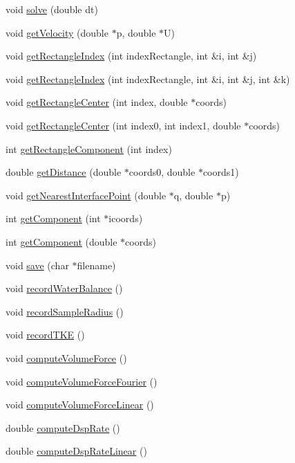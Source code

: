 \begin{DoxyCompactItemize}
\item 
void \hyperlink{class_v_c_a_r_t_e_s_i_a_n_a1f9d11ad6683ce286ca8a8224da163d3}{solve} (double dt)
\item 
void \hyperlink{class_v_c_a_r_t_e_s_i_a_n_ae6f030d1b5c45e224db0189c2fc5cd20}{get\+Velocity} (double $\ast$p, double $\ast$U)
\item 
void \hyperlink{class_v_c_a_r_t_e_s_i_a_n_a2ed1f7cb930cb8229cad5d360f1f1312}{get\+Rectangle\+Index} (int index\+Rectangle, int \&i, int \&j)
\item 
void \hyperlink{class_v_c_a_r_t_e_s_i_a_n_a0d57a78b5d6650d3936a04a30e4b71c2}{get\+Rectangle\+Index} (int index\+Rectangle, int \&i, int \&j, int \&k)
\item 
void \hyperlink{class_v_c_a_r_t_e_s_i_a_n_a9f213b74f5af413073e1ea84e1dd8622}{get\+Rectangle\+Center} (int index, double $\ast$coords)
\item 
void \hyperlink{class_v_c_a_r_t_e_s_i_a_n_a5a2c91e21796299034b920788ce66be0}{get\+Rectangle\+Center} (int index0, int index1, double $\ast$coords)
\item 
int \hyperlink{class_v_c_a_r_t_e_s_i_a_n_a9f3c450b2562cce99cfed1c6d50ae386}{get\+Rectangle\+Component} (int index)
\item 
double \hyperlink{class_v_c_a_r_t_e_s_i_a_n_afd3503a1fcb243ce09bcc0e77b200b67}{get\+Distance} (double $\ast$coords0, double $\ast$coords1)
\item 
void \hyperlink{class_v_c_a_r_t_e_s_i_a_n_a2036c6c5c022e592d4dfedc8078a79b9}{get\+Nearest\+Interface\+Point} (double $\ast$q, double $\ast$p)
\item 
int \hyperlink{class_v_c_a_r_t_e_s_i_a_n_abd1bf3a068e13773053be7035ab7dec7}{get\+Component} (int $\ast$icoords)
\item 
int \hyperlink{class_v_c_a_r_t_e_s_i_a_n_a00cc2c9c6fbb316f91a7c7d910e5124e}{get\+Component} (double $\ast$coords)
\item 
void \hyperlink{class_v_c_a_r_t_e_s_i_a_n_a018724a10eb4dc89e0c3ee2cea58cc3a}{save} (char $\ast$filename)
\item 
void \hyperlink{class_v_c_a_r_t_e_s_i_a_n_af9b1e87fe36a5578d907cf9c848e2f9c}{record\+Water\+Balance} ()
\item 
void \hyperlink{class_v_c_a_r_t_e_s_i_a_n_a1c055e40680d260b42110a3cfc8cf509}{record\+Sample\+Radius} ()
\item 
void \hyperlink{class_v_c_a_r_t_e_s_i_a_n_a8a04ab359f3cb23eea70a74c54e45238}{record\+T\+KE} ()
\item 
void \hyperlink{class_v_c_a_r_t_e_s_i_a_n_afa46b5f900ba6c0bb1a40283ceff699a}{compute\+Volume\+Force} ()
\item 
void \hyperlink{class_v_c_a_r_t_e_s_i_a_n_ada09617a998b2af3ca0def986d051ca3}{compute\+Volume\+Force\+Fourier} ()
\item 
void \hyperlink{class_v_c_a_r_t_e_s_i_a_n_a1f52213e1752985cf34d99ed873708e7}{compute\+Volume\+Force\+Linear} ()
\item 
double \hyperlink{class_v_c_a_r_t_e_s_i_a_n_a2315419f4ec367b65f3a3fcc8dcad92b}{compute\+Dsp\+Rate} ()
\item 
double \hyperlink{class_v_c_a_r_t_e_s_i_a_n_adef094f3251504fcda4e4d2ae6e92c42}{compute\+Dsp\+Rate\+Linear} ()
\end{DoxyCompactItemize}
